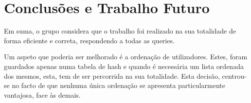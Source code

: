 \documentclass[10pt,a4paper]{report}
\begin{document}
\chapter{Conclusões e Trabalho Futuro}
    Em suma, o grupo considera que o trabalho foi realizado na sua
    totalidade de forma eficiente e correta, respondendo a todas as queries.

    Um aspeto que poderia ser melhorado é a ordenação de utilizadores. Estes,
    foram guardados apenas numa tabela de hash e quando é necessária um lista
    ordenada dos mesmos, esta, tem de ser percorrida na sua totalidade. Esta
    decisão, centrou-se no facto de que nenhuma única ordenação se apresenta
    particularmente vantajosa, face às demais.
\end{document}

